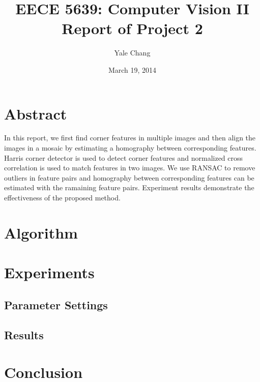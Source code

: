 \documentclass[11pt]{article}
\title{\textbf{EECE 5639: Computer Vision II\\
Report of Project 2}}
\author{Yale Chang}
\date{March 19, 2014}
\begin{document}
\maketitle

\section{Abstract}
In this report, we first find corner features in multiple images and then align the images in
a mosaic by estimating a homography between corresponding features. Harris corner detector is
used to detect corner features and normalized cross correlation is used to match features in
two images. We use RANSAC to remove outliers in feature pairs and homography between corresponding
features can be estimated with the ramaining feature pairs. Experiment results demonstrate
the effectiveness of the proposed method.

\section{Algorithm}


\section{Experiments}
\subsection{Parameter Settings}

\subsection{Results}

\section{Conclusion}
\end{document}
